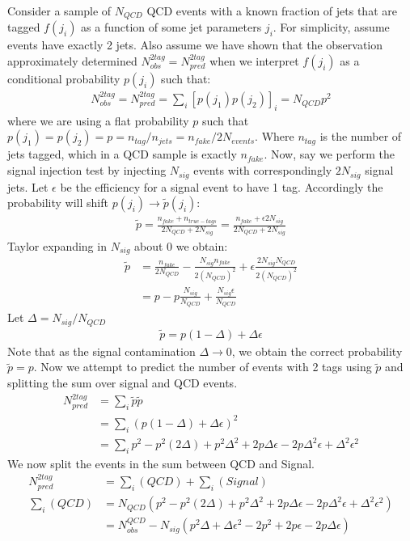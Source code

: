 Consider a sample of $N_{QCD}$ QCD events with a known fraction of jets that are tagged $f(j_i)$ as a function of some jet parameters $j_i$. 
For simplicity, assume events have exactly 2 jets. Also assume 
we have shown that the observation approximately determined $N_{obs}^{2tag} = N_{pred}^{2tag}$ when we interpret $f(j_i)$ as a conditional probability 
$p(j_i)$ such that:
\begin{align*}
N_{obs}^{2tag} = N_{pred}^{2tag} = \sum_i [p(j_1)p(j_2)]_{i}  = N_{QCD}p^2 
\end{align*}
where we are using a flat probability $p$ such that  $p(j_1)=p(j_2)=p=n_{tag}/n_{jets} =  n_{fake} / 2N_{events}$. Where $n_{tag}$ is the number of jets tagged, which 
in a QCD sample is exactly $n_{fake}$. Now, say we perform the signal injection test by
injecting $N_{sig}$ events with correspondingly $2N_{sig}$ signal jets. Let $\epsilon$ be the efficiency for a signal event to have 1 tag. 
 Accordingly the probability will shift $p(j_i)\rightarrow \tilde{p}(j_i)$:
\begin{align*}
\tilde{p} = \frac{n_{fake} + n_{true-tags}}{2N_{QCD} + 2N_{sig}} = \frac{n_{fake} + \epsilon 2N_{sig} }{2N_{QCD} + 2N_{sig}}
\end{align*}
Taylor expanding in $N_{sig}$ about 0 we obtain:
\begin{align*}
\tilde{p} &= \frac{n_{fake}}{2N_{QCD}} - \frac{N_{sig}n_{fake}}{2(N_{QCD})^2} + \epsilon\frac{2N_{sig} N_{QCD}}{2(N_{QCD})^2}\\
&= p - p\frac{N_{sig}}{N_{QCD}} + \frac{N_{sig}\epsilon}{N_{QCD}}
\end{align*}
Let $\Delta = N_{sig}/{N_{QCD}}$
\begin{align*}
\tilde{p} = p(1-\Delta) + \Delta\epsilon
\end{align*}
Note that as the signal contamination  $\Delta\rightarrow 0$, we obtain the correct probability $\tilde{p}=p$. 
Now we attempt to predict the number of events with 2 tags using $\tilde{p}$ and splitting the sum over signal and QCD events.
\begin{align*}
N_{pred}^{2tag} &= \sum_i \tilde{p}\tilde{p}\\ 
&= \sum_i (p(1-\Delta) + \Delta\epsilon)^2\\ 
&= \sum_i p^2 - p^2(2\Delta) + p^2\Delta^2 + 2p\Delta \epsilon - 2 p \Delta^2 \epsilon + \Delta^2 \epsilon^2
\end{align*}
We now split the events in the sum between QCD and Signal. 
\begin{align*}
N_{pred}^{2tag} &= \sum_i (QCD) + \sum_i (Signal)\\
\sum_i (QCD) &= N_{QCD} ( p^2 - p^2(2\Delta) + p^2\Delta^2 + 2p\Delta \epsilon - 2 p \Delta^2 \epsilon + \Delta^2 \epsilon^2)\\
&= N_{obs}^{QCD} - N_{sig}(p^2\Delta + \Delta \epsilon^2 - 2p^2 + 2p\epsilon - 2p\Delta \epsilon) 
\end{align*}
